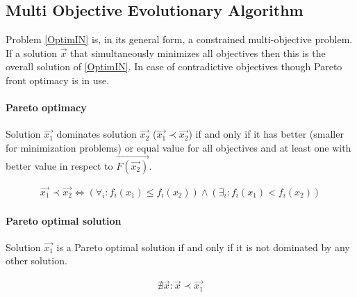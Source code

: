 
\subsection{Multi Objective Evolutionary Algorithm}
Problem \ref{OptimIN} is, in its general form, a constrained multi-objective problem. If a solution $\overrightarrow{x}$ that simultaneously minimizes all objectives then this is the overall solution of \ref{OptimIN}. In case of contradictive objectives though Pareto front optimacy is in use.

\paragraph{Pareto optimacy} Solution $\overrightarrow{x_1}$ dominates solution $\overrightarrow{x_2}$ ($\overrightarrow{x_1}\prec\overrightarrow{x_2}$) if and only if it has better (smaller for minimization problems) or equal value for all objectives and at least one with better value in respect to $\overrightarrow{F(\overrightarrow{x_2})}$.

\begin{eqnarray}
    \overrightarrow{x_1}\prec\overrightarrow{x_2} \Leftrightarrow (\forall _i :  f_i(x_1) \leq f_i(x_2))\wedge (\exists _i : f_i(x_1) < f_i(x_2))
   \label{pareto_eq} 
\end{eqnarray}

\paragraph{Pareto optimal solution} Solution  $\overrightarrow{x_1}$ is a Pareto optimal solution if and only if it is not dominated by any other solution.%


\begin{eqnarray}
    \nexists\overrightarrow{x}:\overrightarrow{x}\prec\overrightarrow{x_1}
\end{eqnarray}
 

